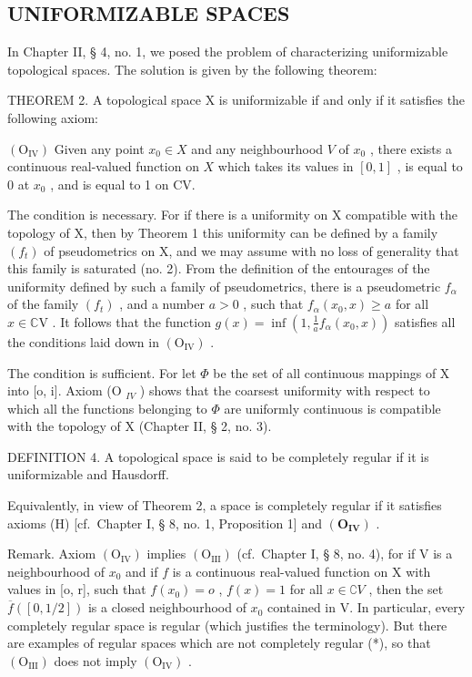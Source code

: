 \subsection{UNIFORMIZABLE SPACES}

In Chapter II, § 4, no. 1, we posed the problem of characterizing uniformizable topological spaces. The solution is given by the following theorem:

THEOREM 2. A topological space X is uniformizable if and only if it satisfies the following axiom:

\((\mathrm{O}_{\mathrm{IV}})\) Given any point \(x_0 \in X\) and any neighbourhood \(V\) of \(x_0\) , there exists a continuous real-valued function on \(X\) which takes its values in \([0,1]\) , is equal to 0 at \(x_0\) , and is equal to 1 on CV.

The condition is necessary. For if there is a uniformity on X compatible with the topology of X, then by Theorem 1 this uniformity can be defined by a family \((f_{t})\) of pseudometrics on X, and we may assume with no loss of generality that this family is saturated (no. 2). From the definition of the entourages of the uniformity defined by such a family of pseudometrics, there is a pseudometric \(f_{\alpha}\) of the family \((f_{t})\) , and a number \(a > 0\) , such that \(f_{\alpha}(x_0, x) \geqslant a\) for all \(x \in \mathbb{C}\mathrm{V}\) . It follows that the function \(g(x) = \inf \left(1, \frac{1}{a} f_{\alpha}(x_0, x)\right)\) satisfies all the conditions laid down in \((\mathrm{O}_{\mathrm{IV}})\) .

The condition is sufficient. For let \(\Phi\) be the set of all continuous mappings of X into {[}o, i{]}. Axiom (O \(_{IV}\) ) shows that the coarsest uniformity with respect to which all the functions belonging to \(\Phi\) are uniformly continuous is compatible with the topology of X (Chapter II, § 2, no. 3).

DEFINITION 4. A topological space is said to be completely regular if it is uniformizable and Hausdorff.

Equivalently, in view of Theorem 2, a space is completely regular if it satisfies axioms (H) {[}cf.~Chapter I, § 8, no. 1, Proposition 1{]} and \((\mathbf{O}_{\mathbf{IV}})\) .

Remark. Axiom \((\mathrm{O}_{\mathrm{IV}})\) implies \((\mathrm{O}_{\mathrm{III}})\) (cf.~Chapter I, § 8, no. 4), for if V is a neighbourhood of \(x_0\) and if \(f\) is a continuous real-valued function on X with values in {[}o, r{]}, such that \(f(x_0) = o\) , \(f(x) = 1\) for all \(x \in \complement V\) , then the set \(\overline{f}([0, 1/2])\) is a closed neighbourhood of \(x_0\) contained in V. In particular, every completely regular space is regular (which justifies the terminology). But there are examples of regular spaces which are not completely regular (*), so that \((\mathrm{O}_{\mathrm{III}})\) does not imply \((\mathrm{O}_{\mathrm{IV}})\) .

